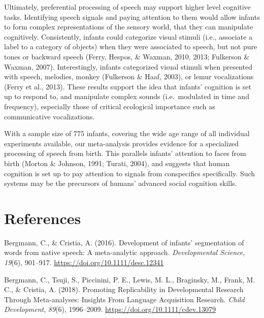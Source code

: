 \documentclass[
  english,
  man]{apa6}
\begin{document}
Ultimately, preferential processing of speech may support higher level cognitive tasks. Identifying speech signals and paying attention to them would allow infants to form complex representations of the sensory world, that they can manipulate cognitively. Consistently, infants could categorize visual stimuli (i.e., associate a label to a category of objects) when they were associated to speech, but not pure tones or backward speech (Ferry, Hespos, \& Waxman, 2010, 2013; Fulkerson \& Waxman, 2007). Interestingly, infants categorized visual stimuli when presented with speech, melodies, monkey (Fulkerson \& Haaf, 2003), or lemur vocalizations (Ferry et al., 2013). These results support the idea that infants' cognition is set up to respond to, and manipulate complex sounds (i.e.~modulated in time and frequency), especially those of critical ecological importance such as communicative vocalizations.

With a sample size of 775 infants, covering the wide age range of all individual experiments available, our meta-analysis provides evidence for a specialized processing of speech from birth. This parallels infants' attention to faces from birth (Morton \& Johnson, 1991; Turati, 2004), and suggests that human cognition is set up to pay attention to signals from conspecifics specifically. Such systems may be the precursors of humans' advanced social cognition skills.

\newpage

\hypertarget{references}{%
\section{References}\label{references}}

\begingroup
\setlength{\parindent}{-0.5in}
\setlength{\leftskip}{0.5in}

\hypertarget{refs}{}
\leavevmode\hypertarget{ref-bergmann_development_2016}{}%
Bergmann, C., \& Cristia, A. (2016). Development of infants' segmentation of words from native speech: A meta-analytic approach. \emph{Developmental Science}, \emph{19}(6), 901--917. \url{https://doi.org/10.1111/desc.12341}

\leavevmode\hypertarget{ref-bergmann_promoting_2018}{}%
Bergmann, C., Tsuji, S., Piccinini, P. E., Lewis, M. L., Braginsky, M., Frank, M. C., \& Cristia, A. (2018). Promoting Replicability in Developmental Research Through Meta-analyses: Insights From Language Acquisition Research. \emph{Child Development}, \emph{89}(6), 1996--2009. \url{https://doi.org/10.1111/cdev.13079}
\end{document}
